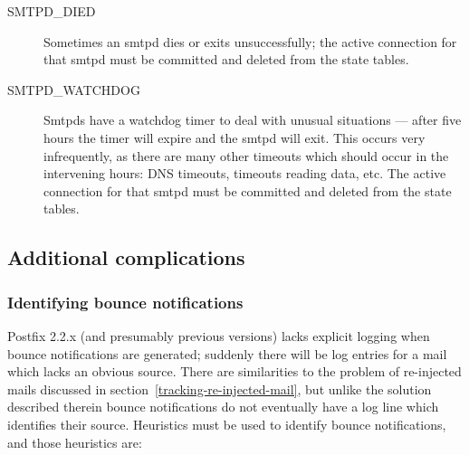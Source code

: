 \documentclass[a4paper,12pt,draft]{article}
\begin{document}
\begin{description}
    \item [SMTPD\_DIED] Sometimes an smtpd dies or exits unsuccessfully;
        the active connection for that smtpd must be committed and deleted
        from the state tables.

    \item [SMTPD\_WATCHDOG] Smtpds have a watchdog timer to deal with
        unusual situations --- after five hours the timer will expire and
        the smtpd will exit.  This occurs very infrequently, as there are
        many other timeouts which should occur in the intervening hours:
        DNS timeouts, timeouts reading data, etc.  The active connection
        for that smtpd must be committed and deleted from the state tables.

\end{description}

\subsection{Additional complications}

\label{additional complications}

\subsubsection{Identifying bounce notifications}

\label{identifying-bounce-notifications}

Postfix 2.2.x (and presumably previous versions) lacks explicit logging
when bounce notifications are generated; suddenly there will be log entries
for a mail which lacks an obvious source.  There are similarities to the
problem of re-injected mails discussed in
section~\ref{tracking-re-injected-mail}, but unlike the solution described
therein bounce notifications do not eventually have a log line which
identifies their source.  Heuristics must be used to identify bounce
notifications, and those heuristics are:
\end{document}
